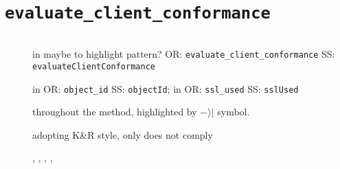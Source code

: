 \clearpage
\section{\normalfont\texttt{evaluate\_client\_conformance}}
\inputminted{java}{"./java/evaluate_client_conformance.java"}


\begin{description}
	\item [] 
		in  maybe to highlight pattern? 
			OR: \texttt{evaluate\_client\_conformance}
			SS: \texttt{evaluateClientConformance}
	\item [] 
		in  
			OR: \texttt{object\_id}
			SS: \texttt{objectId}; 
		in  
			OR: \texttt{ssl\_used}
			SS: \texttt{sslUsed}
	\item []
		throughout the method, highlighted by $-\rangle|$ symbol. %
	\item []
		adopting K\&R style, only  does not comply
	\item [] , , , , 

\end{description}















